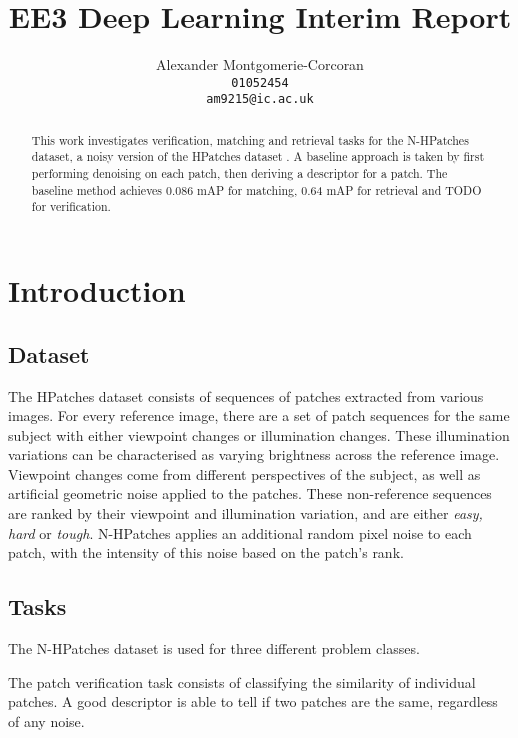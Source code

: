 \documentclass[10pt,twocolumn,letterpaper]{article}
\begin{document}
\title{EE3 Deep Learning Interim Report}

\author{Alexander Montgomerie-Corcoran\\
\texttt{01052454}\\
{\tt\small am9215@ic.ac.uk}
}

\maketitle

\begin{abstract}
   This work investigates verification, matching and retrieval tasks for the N-HPatches dataset, a noisy version of the HPatches dataset \cite{hpatches_2017_cvpr}.
   A baseline approach is taken by first performing denoising on each patch, then deriving a descriptor for a patch. The baseline method achieves 0.086 mAP for matching, 0.64 mAP for retrieval and TODO for verification.
\end{abstract}

\section{Introduction}
\subsection{Dataset}
The HPatches dataset consists of sequences of patches extracted from various images. For every reference image, there are a set of patch sequences for the same subject with either viewpoint changes or illumination changes. These illumination variations can be characterised as varying brightness across the reference image. Viewpoint changes come from different perspectives of the subject, as well as artificial geometric noise applied to the patches. These non-reference sequences are ranked by their viewpoint and illumination variation, and are either \textit{easy, hard} or \textit{tough}. N-HPatches applies an additional random pixel noise to each patch, with the intensity of this noise based on the patch's rank.

\subsection{Tasks}
The N-HPatches dataset is used for three different problem classes. 

The patch verification task consists of classifying the similarity of individual patches. A good descriptor is able to tell if two patches are the same, regardless of any noise.
\end{document}
